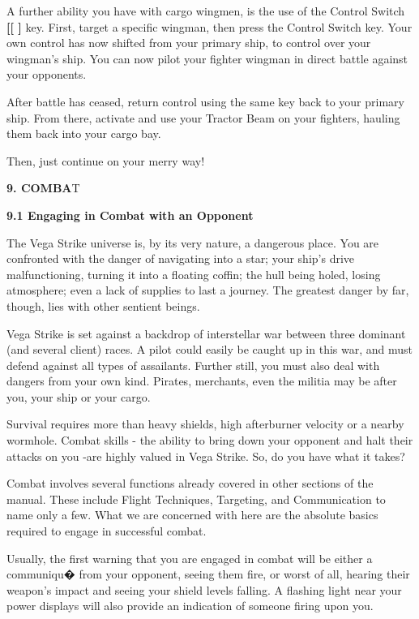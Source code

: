 \documentclass{article}
\begin{document}
A further ability you have with cargo wingmen, is the use of the Control Switch \textbf{[[ ] }key. First, target a specific wingman, then press the Control Switch key. Your own control has now shifted from your primary ship, to control over your wingman's ship. You can now pilot your fighter wingman in direct battle against your opponents. 

After battle has ceased, return control using the same key back to your primary ship. From there, activate and use your Tractor Beam on your fighters, hauling them back into your cargo bay. 

Then, just continue on your merry way! 

\eject 

\textbf{9. COMBA}T





\textbf{}

\textbf{}

\textbf{9.1 Engaging in Combat with an Opponent }

The Vega Strike universe is, by its very nature, a dangerous place. You are confronted with the danger of navigating into a star; your ship's drive malfunctioning, turning it into a floating coffin; the hull being holed, losing atmosphere; even a lack of supplies to last a journey. The greatest danger by far, though, lies with other sentient beings. 

Vega Strike is set against a backdrop of interstellar war between three dominant (and several client) races. A pilot could easily be caught up in this war, and must defend against all types of assailants. Further still, you must also deal with dangers from your own kind. Pirates, merchants, even the militia may be after you, your ship or your cargo. 

Survival requires more than heavy shields, high afterburner velocity or a nearby wormhole. Combat skills - the ability to bring down your opponent and halt their attacks on you -are highly valued in Vega Strike. So, do you have what it takes? 

Combat involves several functions already covered in other sections of the manual. These include Flight Techniques, Targeting, and Communication to name only a few. What we are concerned with here are the absolute basics required to engage in successful combat. 

Usually, the first warning that you are engaged in combat will be either a communiqu� from your opponent, seeing them fire, or worst of all, hearing their weapon's impact and seeing your shield levels falling. A flashing light near your power displays will also provide an indication of someone firing upon you. 
\end{document}
